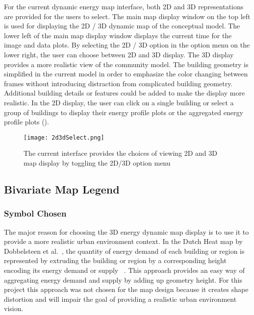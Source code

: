 For the current dynamic energy map interface, both 2D and 3D
representations are provided for the users to select.  The main map
display window on the top left is used for displaying the 2D / 3D
dynamic map of the conceptual model. The lower left of the main map
display window displays the current time for the image and data
plots. By selecting the 2D / 3D option in the option menu on the lower
right, the user can choose between 2D and 3D display. The 3D display
provides a more realistic view of the community model. The building
geometry is simplified in the current model in order to emphasize the
color changing between frames without introducing distraction from
complicated building geometry. Additional building details or features
could be added to make the display more realistic. In the 2D display,
the user can click on a single building or select a group of buildings
to display their energy profile plots or the aggregated energy profile
plots ().

\begin{figure}[h!]
  \centering
  \texttt{[image: 2d3dSelect.png]}
  \caption[Map Display of 2D and 3D]{The current interface provides
    the choices of viewing 2D and 3D map display by toggling the 2D/3D
    option menu}
  \label{fig:2d3dSelect}
\end{figure}

\subsection{Bivariate Map Legend} \label{bivariate}

\subsubsection{Symbol Chosen}
The major reason for choosing the 3D energy dynamic map display is to
use it to provide a more realistic urban environment context.  In the
Dutch Heat map by Dobbelsteen et al.\ , the quantity of energy demand
of each building or region is represented by extruding the building or
region by a corresponding height encoding its energy demand or supply
~\cite{Dobbelsteen2013}. This approach provides an easy way of
aggregating energy demand and supply by adding up geometry height. For
this project this approach was not chosen for the map design because
it creates shape distortion and will impair the goal of providing a
realistic urban environment vision.

